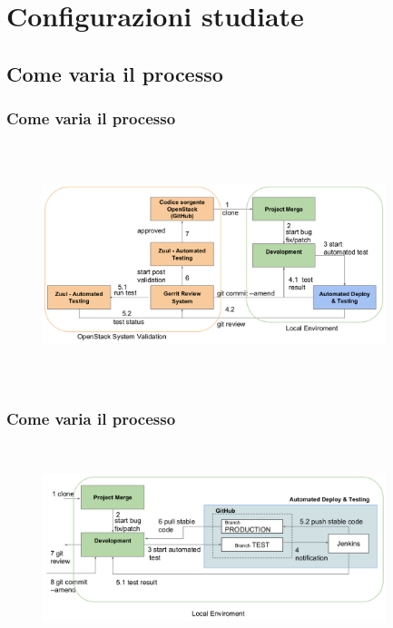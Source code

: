 \documentclass{beamer}
\theoremstyle{definition}
\theoremstyle{plain}
\begin{document}
\section{Configurazioni studiate}
\subsection{Come varia il processo}
\begin{frame}
\frametitle{Come varia il processo}
\begin{figure}[!h]
	\begin{center}
\includegraphics[width=10cm, height=7cm]{sviluppo_ci.png}
\end{center}
\end{figure}
\end{frame}

\begin{frame}
\frametitle{Come varia il processo}
\begin{figure}[!h]
	\begin{center}
\includegraphics[width=10cm, height=6cm]{schema_alto_livello.png}
\end{center}
\end{figure}
\end{frame}
\end{document}
